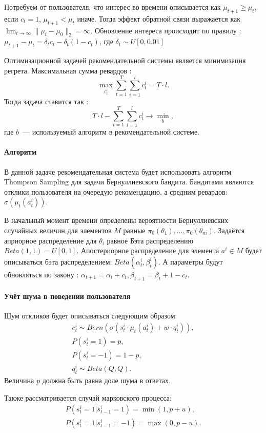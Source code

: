 \documentclass[12pt, twoside]{article}
\begin{document}
Потребуем от пользователя, что интерес во времени описывается как $\mu_{t+1} \geq \mu_{t}$, если $c_t = 1$,  $\mu_{t+1} < \mu_{t}$ иначе. 
Тогда эффект обратной связи выражается как $\lim_{t \to \infty} \|\mu_t - \mu_0 \|_2 = \infty$.
Обновление интереса происходит по правилу : 
$\mu_{t+1} - \mu_{t} = \delta_t c_t - \delta_t (1 - c_t)$, 
где $\delta_t \sim U[0, 0.01]$

Оптимизационной задачей рекомендательной системы является минимизация регрета. 
Максимальная сумма ревардов : \[ \max_{c_t^i} \sum_{t = 1}^T \sum_{i = 1}^l c_t^i = T \cdot l.\] 
Тогда задача ставится так : 
\[
  T \cdot l - \sum_{t = 1}^T \sum_{i = 1}^l c_t^i \to \min_{b}, 
\]
где $b$~--- используемый алгоритм в рекомендательной системе. 

\paragraph{Алгоритм}
В данной задаче рекомендательная система будет использовать алгоритм Thompson Sampling для задачи Бернуллиевского бандита.  
Бандитами являются отклики пользователя на очередую рекомендацию, а средним ревардов: $\sigma(\mu_t(a_t^i))$.

В начальный момент времени определены вероятности Бернуллиевских случайных величин для элементов $M$ равные $\pi_0(\theta_1), \dots, \pi_0(\theta_m)$. 
Задаётся априорное распределение для $\theta_i$ равное Бэта распределению $Beta(1, 1) = U[0, 1]$. 
Апостериорное распределение для элемента $a^i \in M$ будет описываться бэта распределением: $Beta(\alpha_t^i, \beta_t^i)$. 
А параметры будут обновляться по закону :
$\alpha_{t+1} = \alpha_t + c_t, \beta_{t+1} = \beta_t + 1 - c_t$.

\paragraph{Учёт шума в поведении пользователя}
Шум откликов будет описываться следующим образом: 
\begin{gather*}
  c_t^i \sim Bern (\sigma(s_t^i \cdot \mu_t(a_t^i) + w \cdot q_t^i)), \\
  P(s_t^i = 1) = p, \\ P(s_t^i = -1) = 1 - p, \\
  q_t^i \sim Beta (Q, Q).
\end{gather*}
Величина $p$ должна быть равна доле шума в ответах. 

Также рассматривается случай марковского процесса: 
\begin{gather*}
  P(s_t^i = 1 | s_{t-1}^i = 1) = \min(1, p + u), \\ 
  P(s_t^i = 1 | s_{t-1}^i = -1) = \max(0, p - u). 
\end{gather*}
\end{document}
